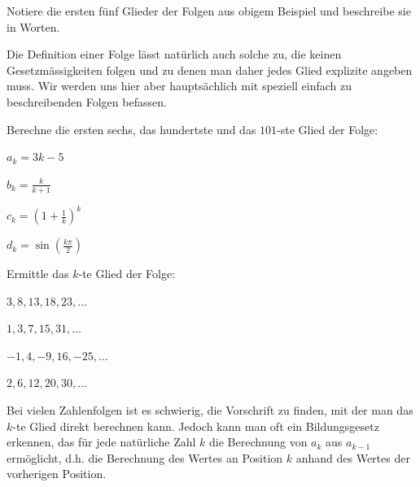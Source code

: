 \documentclass[%
11pt,%
twoside,%
titlepage,%
german,%
headsepline%
]{scrartcl}
\begin{document}
\begin{ueb}[Schreibweise]
Notiere die ersten f\"unf Glieder der Folgen aus obigem Beispiel und beschreibe sie in Worten.
\end{ueb}
Die Definition einer Folge l\"asst nat\"urlich auch solche zu, die keinen Gesetzm\"assigkeiten folgen und zu denen man daher jedes Glied explizite angeben muss. Wir werden uns hier aber haupts\"achlich mit speziell einfach zu beschreibenden Folgen befassen.
\begin{ueb}
Berechne die ersten sechs, das hundertste und das $101$-ste Glied der Folge:

\begin{minipage}{0.3\textwidth}
\begin{enumeratea}
\item $a_k=3k-5$
\item $b_k=\frac{k}{k+1}$
\end{enumeratea}
\end{minipage}
\begin{minipage}{0.3\textwidth}
\begin{enumeratea}
\addtocounter{enumi}{2}
\item $c_k=\left(1+\frac{1}{k}\right)^k$
\item $d_k=\sin\left(\frac{k\pi}{2}\right)$
\end{enumeratea}
\end{minipage}
\end{ueb}

\begin{ueb}
Ermittle das $k$-te Glied der Folge:

\begin{minipage}{0.3\textwidth}
\begin{enumeratea}
\item $3,8,13,18,23,\dots$
\item $1,3,7,15,31,\dots$
\end{enumeratea}
\end{minipage}
\begin{minipage}{0.3\textwidth}
\begin{enumeratea}
\addtocounter{enumi}{2}
\item $-1,4,-9,16,-25,\dots$
\item $2,6,12,20,30,\dots$
\end{enumeratea}
\end{minipage}
\end{ueb}

\begin{bem}
Bei vielen Zahlenfolgen ist es schwierig, die Vorschrift zu finden, mit der man das $k$-te Glied direkt berechnen kann. Jedoch kann man oft ein Bildungsgesetz erkennen, das f\"ur jede nat\"urliche Zahl $k$ die Berechnung von $a_k$ aus $a_{k-1}$ erm\"oglicht, d.h. die Berechnung des Wertes an Position $k$ anhand des Wertes der vorherigen Position.
\end{bem}
\end{document}
